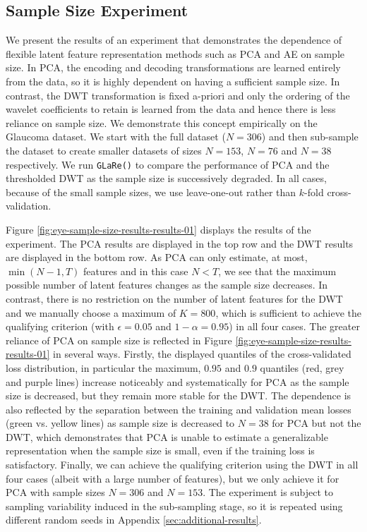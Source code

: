 \subsection{Sample Size Experiment}\label{sec:sample-size-experiment}

We  present the results of an experiment that demonstrates the dependence of flexible latent feature representation methods such as PCA and AE on sample size.
In PCA, the encoding and decoding transformations are learned entirely from the data, so it is highly dependent on having a sufficient sample size.
In contrast, the DWT transformation is fixed a-priori and only the ordering of the wavelet coefficients to retain is learned from the data and hence there is less reliance on sample size.
We demonstrate this concept empirically on the Glaucoma dataset. 
We start with the full dataset ($N=306$) and then sub-sample the dataset to create smaller datasets of sizes $N=153$, $N=76$ and $N=38$ respectively.
We run \texttt{GLaRe()} to compare the performance of PCA and the thresholded DWT as the sample size is successively degraded.
In all cases, because of the small sample sizes, we use leave-one-out rather than $k$-fold cross-validation.

Figure \ref{fig:eye-sample-size-results-results-01} displays the results of the experiment.
The PCA results are displayed in the top row and the DWT results are displayed in the bottom row.
As PCA can only estimate, at most, $\min(N-1, T)$ features and in this case $N<T$, we see that the maximum possible number of latent features changes as the sample size decreases.
In contrast, there is no restriction on the number of latent features for the DWT and we manually choose a maximum of $K=800$, which is sufficient to achieve the qualifying criterion (with $\epsilon=0.05$ and $1 - \alpha=0.95$) in all four cases.
The greater reliance of PCA on sample size is reflected in Figure \ref{fig:eye-sample-size-results-results-01} in several ways.
Firstly, the displayed quantiles of the cross-validated loss distribution, in particular the maximum, $0.95$ and $0.9$ quantiles (red, grey and purple lines) increase noticeably and systematically for PCA as the sample size is decreased, but they remain more stable for the DWT.
The dependence is also reflected by the separation between the training and validation mean losses (green vs. yellow lines) as sample size is decreased to $N=38$ for PCA but not the DWT, which demonstrates that PCA is unable to estimate a generalizable representation when the sample size is small, even if the training loss is satisfactory.
Finally, we can achieve the qualifying criterion using the DWT in all four cases (albeit with a large number of features), but we only achieve it for PCA with sample sizes $N=306$ and $N=153$.
The experiment is subject to sampling variability induced in the sub-sampling stage, so it is repeated using different random seeds in Appendix \ref{sec:additional-results}.


